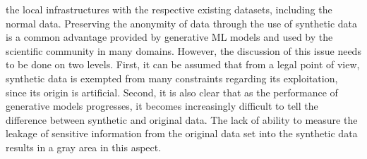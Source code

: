 \documentclass[../../main.tex]{subfiles}
\begin{document}
the local infrastructures with the respective existing datasets, including the normal data. Preserving the anonymity of data through the use of synthetic data is a common advantage provided by generative ML models and used by the scientific community in many domains. However, the discussion of this issue needs to be done on two levels. First, it can be assumed that from a legal point of view, synthetic data is exempted from many constraints regarding its exploitation, since its origin is artificial. Second, it is also clear that as the performance of generative models progresses, it becomes increasingly difficult to tell the difference between synthetic and original data. The lack of ability to measure the leakage of sensitive information from the original data set into the synthetic data results in a gray area in this aspect. 
\end{document}
